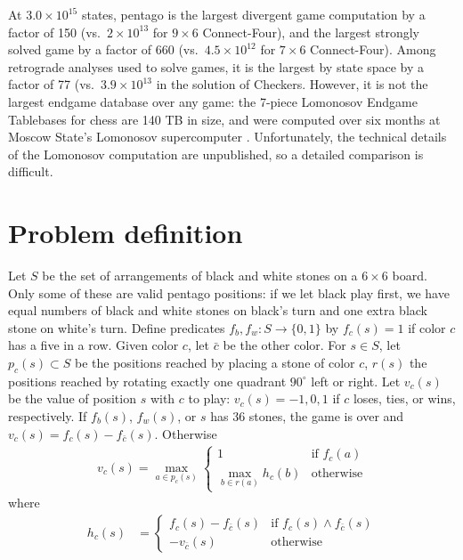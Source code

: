 \documentclass[conference]{IEEEtran}
\begin{document}
At $3.0 \times 10^{15}$ states, pentago is the largest divergent game computation by a factor of
150 (vs.\ $2 \times 10^{13}$ for $9 \times 6$ Connect-Four), and the largest strongly solved game by a factor of
660 (vs.\ $4.5 \times 10^{12}$ for $7 \times 6$ Connect-Four).  Among retrograde analyses used to solve games,
it is the largest by state space by a factor of 77 (vs.\ $3.9 \times 10^{13}$ in the solution of Checkers.
However, it is not the largest endgame database over any game: the 7-piece Lomonosov Endgame Tablebases for
chess are 140 TB in size, and were computed over six months at Moscow State's Lomonosov supercomputer
\cite{makhnychev2012chess}.  Unfortunately, the technical details of the Lomonosov computation are unpublished,
so a detailed comparison is difficult.

\section{Problem definition}

Let $S$ be the set of arrangements of black and white stones on a $6 \times 6$ board.  Only some of these are
valid pentago positions: if we let black play first, we have equal numbers of black and white stones on black's
turn and one extra black stone on white's turn.  Define predicates $f_b,f_w : S \to \{0,1\}$ by $f_c(s) = 1$
if color $c$ has a five in a row.  Given color $c$, let $\bar{c}$ be the other color.  For $s \in S$, let
$p_c(s) \subset S$ be the positions reached by placing a stone of color $c$, $r(s)$ the positions reached by
rotating exactly one quadrant $90^\circ$ left or right.  Let $v_c(s)$ be the value of position $s$ with $c$
to play: $v_c(s) = -1,0,1$ if $c$ loses, ties, or wins, respectively.  If $f_b(s)$, $f_w(s)$, or $s$ has 36 stones,
the game is over and $v_c(s) = f_c(s) - f_{\bar{c}}(s)$.  Otherwise
\begin{align*}
v_c(s) = \max_{a \in p_c(s)} \begin{cases}
  1 & \mbox{if } f_c(a) \\
  \max_{b \in r(a)} h_c(b) & \mbox{otherwise}
\end{cases}
\end{align*}
where
\begin{align*}
h_c(s) &= \begin{cases} f_c(s) - f_{\bar{c}}(s) & \mbox{if } f_c(s) \wedge f_{\bar{c}}(s) \\
                        -v_{\bar{c}}(s) & \mbox{otherwise} \end{cases}
\end{align*}
\end{document}
